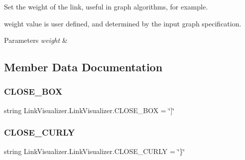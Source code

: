 Set the weight of the link, useful in graph algorithms, for example. 

weight value is user defined, and determined by the input graph specification.


\begin{DoxyParams}{Parameters}
{\em weight} & \\
\hline
\end{DoxyParams}


\subsection{Member Data Documentation}
\hypertarget{class_link_visualizer_1_1_link_visualizer_a53eecc0f75db3bc4f80fd3043371364f}{}\label{class_link_visualizer_1_1_link_visualizer_a53eecc0f75db3bc4f80fd3043371364f} 
\subsubsection{\texorpdfstring{C\+L\+O\+S\+E\+\_\+\+B\+OX}{CLOSE\_BOX}}
{\footnotesize\ttfamily string Link\+Visualizer.\+Link\+Visualizer.\+C\+L\+O\+S\+E\+\_\+\+B\+OX = \char`\"{}\mbox{]}\char`\"{}\hspace{0.3cm}{\ttfamily [static]}}

\hypertarget{class_link_visualizer_1_1_link_visualizer_a32ff73aa930e9c4a76d26912eb0b6fc9}{}\label{class_link_visualizer_1_1_link_visualizer_a32ff73aa930e9c4a76d26912eb0b6fc9} 
\subsubsection{\texorpdfstring{C\+L\+O\+S\+E\+\_\+\+C\+U\+R\+LY}{CLOSE\_CURLY}}
{\footnotesize\ttfamily string Link\+Visualizer.\+Link\+Visualizer.\+C\+L\+O\+S\+E\+\_\+\+C\+U\+R\+LY = \char`\"{}\}\char`\"{}\hspace{0.3cm}{\ttfamily [static]}}

\hypertarget{class_link_visualizer_1_1_link_visualizer_a87bf59ceee60cb2820d9fa5f87d8accb}{}\label{class_link_visualizer_1_1_link_visualizer_a87bf59ceee60cb2820d9fa5f87d8accb} 
